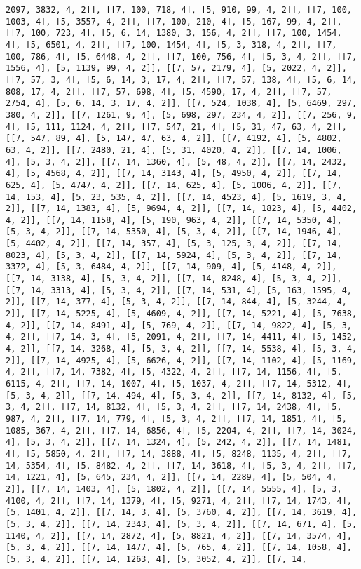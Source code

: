 \documentclass[12pt,fleqn]{article}\usepackage{../../common}
\begin{document}
\begin{verbatim}
2097, 3832, 4, 2]], [[7, 100, 718, 4], [5, 910, 99, 4, 2]], [[7, 100, 1003, 4], [5, 3557, 4, 2]], [[7, 100, 210, 4], [5, 167, 99, 4, 2]], [[7, 100, 723, 4], [5, 6, 14, 1380, 3, 156, 4, 2]], [[7, 100, 1454, 4], [5, 6501, 4, 2]], [[7, 100, 1454, 4], [5, 3, 318, 4, 2]], [[7, 100, 786, 4], [5, 6448, 4, 2]], [[7, 100, 756, 4], [5, 3, 4, 2]], [[7, 1556, 4], [5, 1139, 99, 4, 2]], [[7, 57, 2179, 4], [5, 2022, 4, 2]], [[7, 57, 3, 4], [5, 6, 14, 3, 17, 4, 2]], [[7, 57, 138, 4], [5, 6, 14, 808, 17, 4, 2]], [[7, 57, 698, 4], [5, 4590, 17, 4, 2]], [[7, 57, 2754, 4], [5, 6, 14, 3, 17, 4, 2]], [[7, 524, 1038, 4], [5, 6469, 297, 380, 4, 2]], [[7, 1261, 9, 4], [5, 698, 297, 234, 4, 2]], [[7, 256, 9, 4], [5, 111, 1124, 4, 2]], [[7, 547, 21, 4], [5, 31, 47, 63, 4, 2]], [[7, 547, 89, 4], [5, 147, 47, 63, 4, 2]], [[7, 4192, 4], [5, 4802, 63, 4, 2]], [[7, 2480, 21, 4], [5, 31, 4020, 4, 2]], [[7, 14, 1006, 4], [5, 3, 4, 2]], [[7, 14, 1360, 4], [5, 48, 4, 2]], [[7, 14, 2432, 4], [5, 4568, 4, 2]], [[7, 14, 3143, 4], [5, 4950, 4, 2]], [[7, 14, 625, 4], [5, 4747, 4, 2]], [[7, 14, 625, 4], [5, 1006, 4, 2]], [[7, 14, 153, 4], [5, 23, 535, 4, 2]], [[7, 14, 4523, 4], [5, 1619, 3, 4, 2]], [[7, 14, 1383, 4], [5, 9694, 4, 2]], [[7, 14, 1823, 4], [5, 4402, 4, 2]], [[7, 14, 1158, 4], [5, 190, 963, 4, 2]], [[7, 14, 5350, 4], [5, 3, 4, 2]], [[7, 14, 5350, 4], [5, 3, 4, 2]], [[7, 14, 1946, 4], [5, 4402, 4, 2]], [[7, 14, 357, 4], [5, 3, 125, 3, 4, 2]], [[7, 14, 8023, 4], [5, 3, 4, 2]], [[7, 14, 5924, 4], [5, 3, 4, 2]], [[7, 14, 3372, 4], [5, 3, 6484, 4, 2]], [[7, 14, 909, 4], [5, 4148, 4, 2]], [[7, 14, 3138, 4], [5, 3, 4, 2]], [[7, 14, 8248, 4], [5, 3, 4, 2]], [[7, 14, 3313, 4], [5, 3, 4, 2]], [[7, 14, 531, 4], [5, 163, 1595, 4, 2]], [[7, 14, 377, 4], [5, 3, 4, 2]], [[7, 14, 844, 4], [5, 3244, 4, 2]], [[7, 14, 5225, 4], [5, 4609, 4, 2]], [[7, 14, 5221, 4], [5, 7638, 4, 2]], [[7, 14, 8491, 4], [5, 769, 4, 2]], [[7, 14, 9822, 4], [5, 3, 4, 2]], [[7, 14, 3, 4], [5, 2091, 4, 2]], [[7, 14, 4411, 4], [5, 1452, 4, 2]], [[7, 14, 3268, 4], [5, 3, 4, 2]], [[7, 14, 5538, 4], [5, 3, 4, 2]], [[7, 14, 4925, 4], [5, 6626, 4, 2]], [[7, 14, 1102, 4], [5, 1169, 4, 2]], [[7, 14, 7382, 4], [5, 4322, 4, 2]], [[7, 14, 1156, 4], [5, 6115, 4, 2]], [[7, 14, 1007, 4], [5, 1037, 4, 2]], [[7, 14, 5312, 4], [5, 3, 4, 2]], [[7, 14, 494, 4], [5, 3, 4, 2]], [[7, 14, 8132, 4], [5, 3, 4, 2]], [[7, 14, 8132, 4], [5, 3, 4, 2]], [[7, 14, 2438, 4], [5, 987, 4, 2]], [[7, 14, 779, 4], [5, 3, 4, 2]], [[7, 14, 1851, 4], [5, 1085, 367, 4, 2]], [[7, 14, 6856, 4], [5, 2204, 4, 2]], [[7, 14, 3024, 4], [5, 3, 4, 2]], [[7, 14, 1324, 4], [5, 242, 4, 2]], [[7, 14, 1481, 4], [5, 5850, 4, 2]], [[7, 14, 3888, 4], [5, 8248, 1135, 4, 2]], [[7, 14, 5354, 4], [5, 8482, 4, 2]], [[7, 14, 3618, 4], [5, 3, 4, 2]], [[7, 14, 1221, 4], [5, 645, 234, 4, 2]], [[7, 14, 2289, 4], [5, 504, 4, 2]], [[7, 14, 1403, 4], [5, 1802, 4, 2]], [[7, 14, 5555, 4], [5, 3, 4100, 4, 2]], [[7, 14, 1379, 4], [5, 9271, 4, 2]], [[7, 14, 1743, 4], [5, 1401, 4, 2]], [[7, 14, 3, 4], [5, 3760, 4, 2]], [[7, 14, 3619, 4], [5, 3, 4, 2]], [[7, 14, 2343, 4], [5, 3, 4, 2]], [[7, 14, 671, 4], [5, 1140, 4, 2]], [[7, 14, 2872, 4], [5, 8821, 4, 2]], [[7, 14, 3574, 4], [5, 3, 4, 2]], [[7, 14, 1477, 4], [5, 765, 4, 2]], [[7, 14, 1058, 4], [5, 3, 4, 2]], [[7, 14, 1263, 4], [5, 3052, 4, 2]], [[7, 14, 
\end{verbatim}
\end{document}
